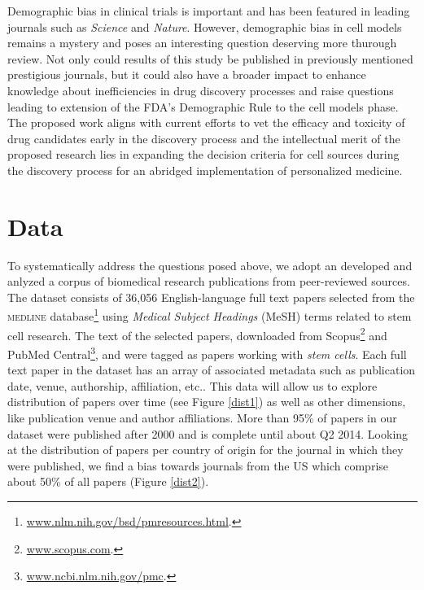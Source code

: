 \documentclass[10pt]{article}
\begin{document}
Demographic bias in clinical trials is important and has been featured in leading journals such as \textit{Science} and \textit{Nature}. However, demographic bias in cell models remains a mystery and poses an interesting question deserving more thurough review. Not only could results of this study be published in previously mentioned prestigious journals, but it could also have a broader impact to enhance knowledge about inefficiencies in drug discovery processes and raise questions leading to extension of the FDA's Demographic Rule to the cell models phase. The proposed work aligns with current efforts to vet the efficacy and toxicity of drug candidates early in the discovery process and the intellectual merit of the proposed research lies in expanding the decision criteria for cell sources during the discovery process for an abridged implementation of personalized medicine.

\section{Data}

To systematically address the questions posed above, we adopt an developed and anlyzed a corpus of biomedical research publications from peer-reviewed sources. The dataset consists of 36,056 English-language full text papers selected from the \textsc{medline} database\footnote{\url{www.nlm.nih.gov/bsd/pmresources.html}.} using \textit{Medical Subject Headings} (MeSH) terms related to stem cell research. The text of the selected papers, downloaded from Scopus\footnote{\url{www.scopus.com}.} and PubMed Central\footnote{\url{www.ncbi.nlm.nih.gov/pmc}.}, and were tagged as papers working with \textit{stem cells}. Each full text paper in the dataset has an array of associated metadata such as publication date, venue, authorship, affiliation, etc.. This data will allow us to explore distribution of papers over time (see Figure \ref{dist1}) as well as other dimensions, like publication venue and author affiliations. More than 95\% of papers in our dataset were published after 2000 and is complete until about Q2 2014. Looking at the distribution of papers per country of origin for the journal in which they were published, we find a bias towards journals from the US which comprise about 50\% of all papers (Figure \ref{dist2}).
\end{document}
